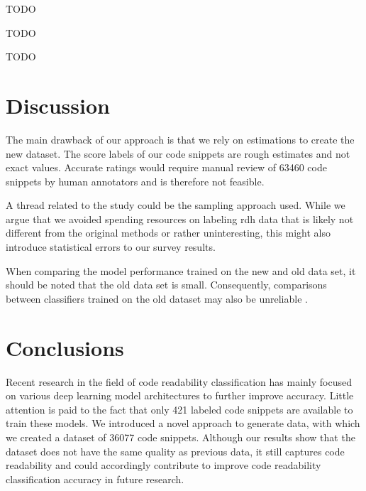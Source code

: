 \documentclass[%
class=scrreprt,
chapterprefix=false,%
open=right,%
twoside=false,%
paper=a4,%
logofile={Logo\_zentral\_farbig\_EN.png},%
thesistype=master,%
UKenglish,%
]{se2thesis}
\theoremstyle{definition}
\newcommand{\numSamples}{36077 }
\newenvironment{researchbox}[1]{\begin{tcolorbox}[colback=blue!10!white,colframe=blue!50!black,title=#1]}{\end{tcolorbox}}
\begin{document}
	\begin{researchbox}{Summary (RQ1 - select-well):}
		TODO
	\end{researchbox}
	
	\begin{researchbox}{Summary (RQ2 - generate-poo):}
		TODO
	\end{researchbox}
	
	\begin{researchbox}{Summary (RQ3 - new-data):}
		TODO
	\end{researchbox}
	
\section{Discussion} \label{Discussion}

	The main drawback of our approach is that we rely on estimations to create the new dataset. The score labels of our code snippets are rough estimates and not exact values. Accurate ratings would require manual review of 63460 code snippets by human annotators and is therefore not feasible.
	
	A thread related to the study could be the sampling approach used. While we argue that we avoided spending resources on labeling rdh data that is likely not different from the original methods or rather uninteresting, this might also introduce statistical errors to our survey results.
	
	When comparing the model performance trained on the new and old data set, it should be noted that the old data set is small. Consequently, comparisons between classifiers trained on the old dataset may also be unreliable \cite{mi2022towards}.
	
\section{Conclusions} \label{Conclusions}
	Recent research in the field of code readability classification has mainly focused on various deep learning model architectures to further improve accuracy. Little attention is paid to the fact that only 421 labeled code snippets are available to train these models. We introduced a novel approach to generate data, with which we created a dataset of \numSamples code snippets. Although our results show that the dataset does not have the same quality as previous data, it still captures code readability and could accordingly contribute to improve code readability classification accuracy in future research.
	
\end{document}
